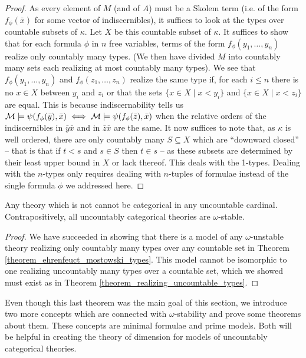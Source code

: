\begin{proof}
As every element of \(M\) (and of \(A\)) must be a Skolem term (i.e. of the form \(f_\phi(\bar{x})\) for some vector of indiscernibles), it suffices to look at the types over countable subsets of \(\kappa\).
Let \(X\) be this countable subset of \(\kappa\). 
It suffices to show that for each formula \(\phi\) in \(n\) free variables, terms of the form \(f_\phi(y_1, \ldots, y_n)\) realize only countably many types. 
(We then have divided \(M\) into countably many sets each realizing at most countably many types).
We see that \(f_\phi(y_1, \ldots, y_n)\) and \(f_\phi(z_1, \ldots, z_n)\) realize the same type if, for each \(i \leq n\) there is no \(x \in X\) between \(y_i\) and \(z_i\) or that the sets \(\{x \in X \mid x < y_i\}\) and \(\{x \in X \mid x < z_i\}\) are equal. 
This is because indiscernability tells us \(\mathcal{M} \models \psi(f_\phi(\bar{y}), \bar{x}) \iff \mathcal{M} \models \psi(f_\phi(\bar{z}), \bar{x})\) when the relative orders of the indiscernibles in \(\bar{y}\bar{x}\) and in \(\bar{z}\bar{x}\) are the same. 
It now suffices to note that, as \(\kappa\) is well ordered, there are only countably many \(S \subseteq X\) which are ``downward closed'' -- that is that if \(t < s\) and \(s \in S\) then \(t \in s\) -- as these subsets are determined by their least upper bound in \(X\) or lack thereof.
This deals with the 1-types. Dealing with the \(n\)-types only requires dealing with \(n\)-tuples of formulae instead of the single formula \(\phi\) we addressed here. 
\end{proof}

\begin{theorem}\label{theorem_omega_stability_categoricity}
Any theory which is not \omst cannot be categorical in any uncountable cardinal. Contrapositively, all uncountably categorical theories are \(\omega\)-stable.
\end{theorem}

\begin{proof}
We have succeeded in showing that there is a model of any \(\omega\)-unstable theory realizing only countably many types over any countable set in Theorem \ref{theorem_ehrenfeuct_mostowski_types}.
This model cannot be isomorphic to one realizing uncountably many types over a countable set, which we showed must exist as in Theorem \ref{theorem_realizing_uncountable_types}.
\end{proof}

Even though this last theorem was the main goal of this section, we introduce two more concepts which are connected with \(\omega\)-stability and prove some theorems about them. These concepts are minimal formulae and prime models. 
Both will be helpful in creating the theory of dimension for models of uncountably categorical theories. 

